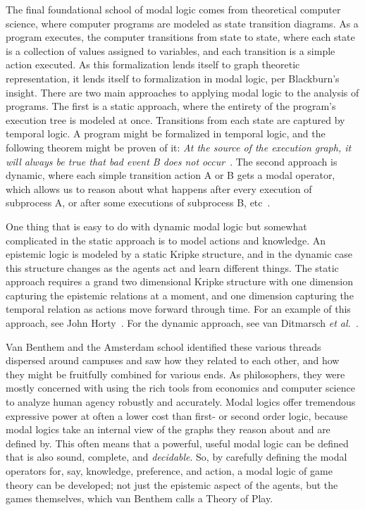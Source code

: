 The final foundational school of modal logic comes from theoretical computer science, where computer programs are modeled as state transition diagrams. As a program executes, the computer transitions from state to state, where each state is a collection of values assigned to variables, and each transition is a simple action executed. As this formalization lends itself to graph theoretic representation, it lends itself to formalization in modal logic, per Blackburn's insight. There are two main approaches to applying modal logic to the analysis of programs. The first is a static approach, where the entirety of the program's execution tree is modeled at once. Transitions from each state are captured by temporal logic. A program might be formalized in temporal logic, and the following theorem might be proven of it: \emph{At the source of the execution graph, it will always be true that bad event B does not occur}~\cite{Pnueli}. The second approach is dynamic, where each simple transition action A or B gets a modal operator, which allows us to reason about what happens after every execution of subprocess A, or after some executions of subprocess B, etc~\cite{HarelKozenTiuryn}. 

One thing that is easy to do with dynamic modal logic but somewhat complicated in the static approach is to model actions and knowledge. An epistemic logic is modeled by a static Kripke structure, and in the dynamic case this structure changes as the agents act and learn different things. The static approach requires a grand two dimensional Kripke structure with one dimension capturing the epistemic relations at a moment, and one dimension capturing the temporal relation as actions move forward through time. For an example of this approach, see John Horty~\cite{Horty}. For the dynamic approach, see van Ditmarsch \emph{et al.}~\cite{DEL}. 

Van Benthem and the Amsterdam school identified these various threads dispersed around campuses and saw how they related to each other, and how they might be fruitfully combined for various ends. As philosophers, they were mostly concerned with using the rich tools from economics and computer science to analyze human agency robustly and accurately. Modal logics offer tremendous expressive power at often a lower cost than first- or second order logic, because modal logics take an internal view of the graphs they reason about and are defined by. This often means that a powerful, useful modal logic can be defined that is also sound, complete, and \emph{decidable}. So, by carefully defining the modal operators for, say, knowledge, preference, and action, a modal logic of game theory can be developed; not just the epistemic aspect of the agents, but the games themselves, which van Benthem calls a Theory of Play. 

